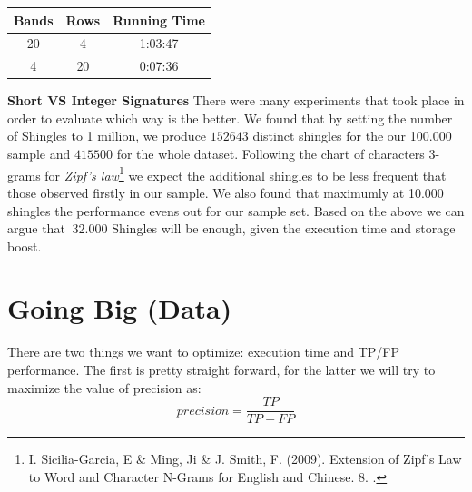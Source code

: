 \documentclass[12pt]{article}
\begin{document}
\begin{center}
 \begin{tabular}{||c  | c |  c||}
 \hline
 Bands & Rows & Running Time \\ [0.5ex]
 \hline\hline
 20  & 4 &  1:03:47 \\
 \hline
 4 & 20 &  0:07:36\\
 \hline
\end{tabular}
\end{center}


\textbf{Short VS Integer Signatures} There were many experiments that took place in order to evaluate which way is the better. We found that by setting the number of Shingles to 1 million, we produce 
$152643$ distinct shingles for the our 100.000 sample and $415500$ for the whole dataset. Following the chart of characters 3-grams for \textit{Zipf's law}\footnote{I. Sicilia-Garcia, E \& Ming, Ji \& J. Smith, F. (2009). Extension of Zipf’s Law to Word and Character N-Grams for English and Chinese. 8. . } we expect the additional shingles to be less frequent that those observed firstly in our sample. We also found that maximumly at 10.000 shingles the performance evens out for our sample set. Based on the above we can argue that $~32.000$ Shingles will be enough, given the execution time and storage boost.


\section{Going Big (Data)}

There are two things we want to optimize: execution time and TP/FP performance. The first is pretty straight forward, for the latter we will try to maximize the value of precision as:
\[precision = \frac{TP}{TP + FP}\]
\end{document}
